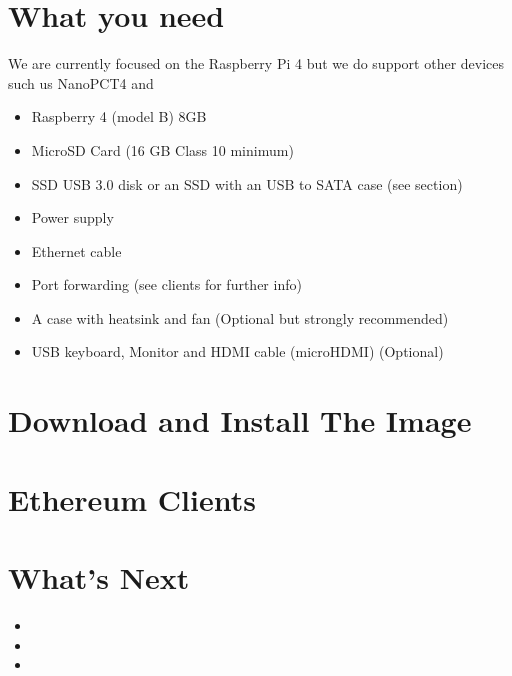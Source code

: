 \documentclass[letterpaper,10pt,english]{sphinxmanual}
\begin{document}
\section{What you need}
\label{\detokenize{quick-guide/what-you-need:what-you-need}}\label{\detokenize{quick-guide/what-you-need::doc}}
We are currently focused on the Raspberry Pi 4 but we do support other devices such us NanoPC\sphinxhyphen{}T4 and
\begin{itemize}
\item {} 
Raspberry 4 (model B) 8GB

\item {} 
MicroSD Card (16 GB Class 10 minimum)

\item {} 
SSD USB 3.0 disk or an SSD with an USB to SATA case (see  section)

\item {} 
Power supply

\item {} 
Ethernet cable

\item {} 
Port forwarding (see clients for further info)

\item {} 
A case with heatsink and fan (Optional but strongly recommended)

\item {} 
USB keyboard, Monitor and HDMI cable (micro\sphinxhyphen{}HDMI) (Optional)

\end{itemize}


\section{Download and Install The Image}
\label{\detokenize{quick-guide/download-and-install:download-and-install-the-image}}\label{\detokenize{quick-guide/download-and-install::doc}}

\section{Ethereum Clients}
\label{\detokenize{quick-guide/ethereum-clients:ethereum-clients}}\label{\detokenize{quick-guide/ethereum-clients::doc}}

\section{What’s Next}
\label{\detokenize{quick-guide/whats-next:what-s-next}}\label{\detokenize{quick-guide/whats-next::doc}}\begin{itemize}
\item {} 

\item {} 

\item {} 

\end{itemize}



\renewcommand{\indexname}{Index}
\printindex
\end{document}
